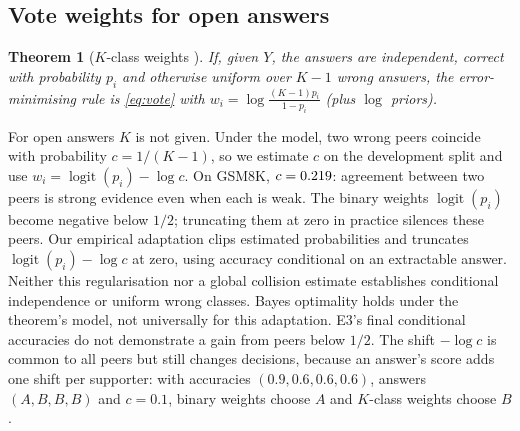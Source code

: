\documentclass[11pt]{article}
\newtheorem{theorem}{Theorem}
\theoremstyle{definition}
\theoremstyle{remark}
\begin{document}
\begin{samepage}
\subsection{Vote weights for open answers}
\begin{theorem}[$K$-class weights {\cite{nitzan1982optimal}}]\label{thm:np}
If, given $Y$, the answers are independent, correct with probability $p_i$ and otherwise uniform over
$K-1$ wrong answers, the error-minimising rule is \eqref{eq:vote} with
$w_i=\log\frac{(K-1)p_i}{1-p_i}$ (plus $\log$ priors).
\end{theorem}
\end{samepage}
For open answers $K$ is not given. Under the model, two wrong peers coincide with probability
$c=1/(K-1)$, so we estimate $c$ on the development split and use $w_i=\operatorname{logit}(p_i)-\log c$.
On GSM8K, $c=0.219$: agreement between two peers is strong evidence even when each is weak.
The binary weights $\operatorname{logit}(p_i)$ become negative below $1/2$; truncating them at zero in
practice silences these peers. Our empirical adaptation clips estimated probabilities and truncates
$\operatorname{logit}(p_i)-\log c$ at zero, using accuracy conditional on an extractable answer.
Neither this regularisation nor a global collision estimate establishes conditional independence or
uniform wrong classes. Bayes optimality holds under the theorem's model, not universally for this
adaptation. E3's final conditional accuracies do not demonstrate a gain from peers below $1/2$.
The shift $-\log c$ is common to all peers but still changes decisions, because an answer's score adds
one shift per supporter: with accuracies $(0.9,0.6,0.6,0.6)$, answers $(A,B,B,B)$ and $c=0.1$, binary
weights choose $A$ and $K$-class weights choose $B$.
\end{document}
